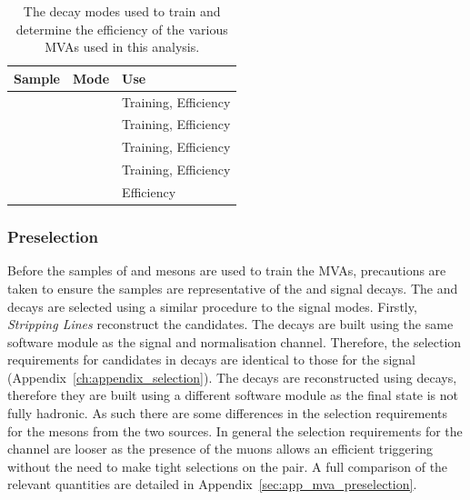 \begin{table}[h]
\centering
\begin{tabular}{lll}
   \hline
   Sample                    & Mode                       & Use \\ 
   \hline
   \decay{\Bsb}{\Dsp\pim}    & \decay{\Dsp}{\Kp\Km\pip}   & Training, Efficiency \\
   \decay{\Bsb}{\Dsp\pim}    & \decay{\Dsp}{\Kp\pim\pip}  & Training, Efficiency \\
   \decay{\Bsb}{\Dsp\pim}    & \decay{\Dsp}{\pip\pim\pip} & Training, Efficiency \\
   \decay{\Bs}{\jpsi\phiz}   & \decay{\phiz}{\Kp\Km}      & Training, Efficiency \\
   \hline
   \decay{\Bp}{\Dzb\pip}     & \decay{\Dzb}{\Kp\Km}       & Efficiency          \\
   \hline
\end{tabular}

\caption{The decay modes used to train and determine the efficiency of the various MVAs used in this analysis.}
\label{tab:mva_modes}
\end{table}

\subsubsection{Preselection}

Before the samples of \Dsp and \phiz mesons are used to train the MVAs, precautions are taken to ensure the samples are representative of the \decay{\Bp}{\Dsp\phiz} and \decay{\Bp}{\Dsp\Kp\Km} signal decays. The \decay{\Bsb}{\Dsp\pim} and \decay{\Bs}{\jpsi\phiz} decays are selected using a similar procedure to the signal modes. Firstly, \emph{Stripping Lines} reconstruct the candidates. The \decay{\Bsb}{\Dsp\pim} decays are built using the same software module as the signal and normalisation channel. Therefore, the selection requirements for \Dsp candidates in \decay{\Bsb}{\Dsp\pim} decays are identical to those for the signal (Appendix~\ref{ch:appendix_selection}).
The \decay{\Bs}{\jpsi\phiz} decays are reconstructed using \decay{\jpsi}{\mup\mun} decays, therefore they are built using a different software module as the final state is not fully hadronic. As such there are some differences in the selection requirements for the \phiz mesons from the two sources. In general the selection requirements for the \decay{\Bs}{\jpsi\phiz} channel are looser as the presence of the muons allows an efficient triggering without the need to make tight selections on the \Kp\Km pair. 
A full comparison of the relevant quantities are detailed in Appendix~\ref{sec:app_mva_preselection}.

